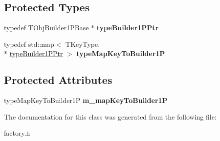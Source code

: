 \subsection*{Protected Types}
\begin{DoxyCompactItemize}
\item 
\hypertarget{class_t_obj_factory1_p_a9b12f4ffd3b68eaf1f1d310ee408f792}{typedef \hyperlink{class_t_obj_factory1_p_1_1_t_obj_builder1_p_base}{T\+Obj\+Builder1\+P\+Base} $\ast$ {\bfseries type\+Builder1\+P\+Ptr}}\label{class_t_obj_factory1_p_a9b12f4ffd3b68eaf1f1d310ee408f792}

\item 
\hypertarget{class_t_obj_factory1_p_a482b7f787f50ed6a7cf639e4c1aae59d}{typedef std\+::map$<$ T\+Key\+Type, \\*
\hyperlink{class_t_obj_factory1_p_1_1_t_obj_builder1_p_base}{type\+Builder1\+P\+Ptr} $>$ {\bfseries type\+Map\+Key\+To\+Builder1\+P}}\label{class_t_obj_factory1_p_a482b7f787f50ed6a7cf639e4c1aae59d}

\end{DoxyCompactItemize}
\subsection*{Protected Attributes}
\begin{DoxyCompactItemize}
\item 
\hypertarget{class_t_obj_factory1_p_ae9883daa9febb2f4d95d4667a2eb2eab}{type\+Map\+Key\+To\+Builder1\+P {\bfseries m\+\_\+map\+Key\+To\+Builder1\+P}}\label{class_t_obj_factory1_p_ae9883daa9febb2f4d95d4667a2eb2eab}

\end{DoxyCompactItemize}


The documentation for this class was generated from the following file\+:\begin{DoxyCompactItemize}
\item 
factory.\+h\end{DoxyCompactItemize}
